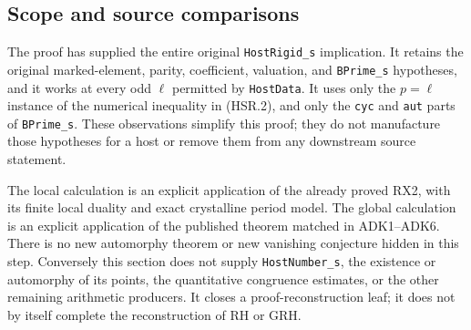 \documentclass[11pt,a4paper]{article}
\numberwithin{equation}{section}
\theoremstyle{remark}\newtheorem{remark}[theorem]{Remark}
\begin{document}
\subsection{Scope and source comparisons}

The proof has supplied the entire original
\texttt{Host\allowbreak Rigid\_\allowbreak s} implication.  It retains the original
marked-element, parity, coefficient, valuation, and
\texttt{BPrime\_\allowbreak s} hypotheses, and it works at every odd
$\ell$ permitted by \texttt{Host\allowbreak Data}.  It uses only the
$p=\ell$ instance of the numerical inequality in (HSR.2), and
only the \texttt{cyc} and \texttt{aut} parts of
\texttt{BPrime\_\allowbreak s}.  These observations simplify this proof;
they do not manufacture those hypotheses for a host or remove
them from any downstream source statement.

The local calculation is an explicit application of the already
proved RX2, with its finite local duality and exact crystalline
period model.  The global calculation is an explicit application
of the published theorem matched in ADK1--ADK6.  There is no new
automorphy theorem or new vanishing conjecture hidden in this
step.  Conversely this section does not supply
\texttt{Host\allowbreak Number\_\allowbreak s}, the existence or automorphy of its points,
the quantitative congruence estimates, or the other remaining
arithmetic producers.  It closes a proof-reconstruction leaf;
it does not by itself complete the reconstruction of RH or GRH.
\end{document}
